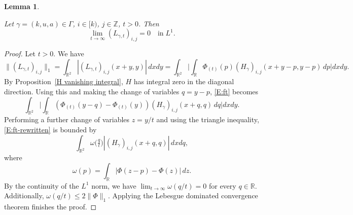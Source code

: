 \documentclass[12pt,reqno]{amsart}
\theoremstyle{plain}
\newtheorem{lemma}[theorem]{Lemma}
\numberwithin{equation}{section}
\theoremstyle{remark}
\newcommand{\uses}[1]{}
\newcommand{\usesdefs}[1]{}
\newcommand{\leanok}{}
\newcommand{\lean}[1]{}
\newcommand{\Z}{{\mathbb Z}}
\newcommand{\R}{{\mathbb R}}
\begin{document}
\begin{lemma}\label{L:ft-infty}
\lean{Auto.lMultiplierAtScale_tendsto_zero}
\leanok
\uses{H vanishing integral}\usesdefs{standard bump,geometric parameters,H multiplier,auto:L-kernel-definition}
Let $\gamma=(k,u,a)\in \Gamma$, $i\in [k)$, $j\in \Z$, $t>0$. Then
\begin{equation}\label{auto:L-kernel-large-scale-limit}
\lim_{t\to \infty} (L_{\gamma,t})_{i,j} = 0 \quad\text{in}\;L^1.
\end{equation}
\end{lemma}

\begin{proof}
Let $t>0$. We have
\begin{equation}\label{E:ft}
\|(L_{\gamma,t})_{i,j}\|_{1}
=\int_{\R^2} |(L_{\gamma,t})_{i,j}(x+y,y)|\,dx dy
=\int_{\R^2} \Big|\int_{\R} \Phi_{(t)}(p) (H_\gamma)_{i,j}(x+y-p,y-p)\,dp\Big| dx dy.
\end{equation}
By Proposition~\ref{H vanishing integral}, $H$ has integral zero in the diagonal direction. Using this and making the change of variables $q=y-p$, \eqref{E:ft} becomes
\begin{equation}\label{E:ft-rewritten}
\int_{\R^2} \Big|\int_{\R} (\Phi_{(t)}(y-q)-\Phi_{(t)}(y)) (H_\gamma)_{i,j}(x+q,q)\,dq\Big| dx dy.
\end{equation}
Performing a further change of variables $z=y/t$ and using the triangle inequality, \eqref{E:ft-rewritten} is bounded by
\[
\int_{\R^2} \omega\Big(\tfrac{q}{t}\Big) |(H_\gamma)_{i,j}(x+q,q)|\,dx dq,
\]
where
\[
\omega(p)=\int_{\R}|\Phi(z-p)-\Phi(z)|\,dz.
\]
By the continuity of the $L^1$ norm, we have $\lim_{t\to \infty} \omega(q/t)=0$ for every $q\in \R$. Additionally, $\omega(q/t) \leq 2\|\Phi\|_1$. Applying the Lebesgue dominated convergence theorem finishes the proof.
\end{proof}
\end{document}
